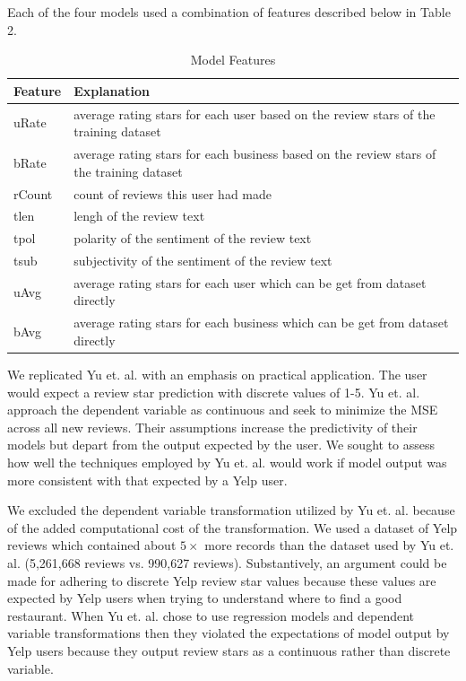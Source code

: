 \documentclass[12pt]{article}
\begin{document}
Each of the four models used a combination of features described below in Table 2.

\begin{table}[h]
  \caption{\label{tab:features}Model Features}
  \centering
\begin{tabular}{| l | l |}
  \hline
  \textbf{Feature} & \textbf{Explanation} \\
  \hline
  uRate & average rating stars for each user based on the review stars of the
          training dataset \\
  \hline
  bRate & average rating stars for each business based on the review stars of the training 
          dataset \\
  \hline
  rCount & count of reviews this user had made \\
  \hline
  tlen & lengh of the review text \\
  \hline
  tpol & polarity of the sentiment of the review text \\
  \hline
  tsub & subjectivity of the sentiment of the review text \\
  \hline
  uAvg & average rating stars for each user which can be get from dataset directly \\
  \hline
  bAvg & average rating stars for each business which can be get from dataset directly \\
  \hline
\end{tabular}
\end{table}

We replicated Yu et. al. \cite{yu2015restaurants} with an emphasis on practical application. The
user would expect a review star prediction with discrete values of 1-5. Yu et. al.
\cite{yu2015restaurants} approach the dependent variable as continuous and seek to minimize
the MSE across all new reviews. Their assumptions increase the predictivity of their models but
depart from the output expected by the user. We sought to assess how well the techniques employed
by Yu et. al. would work if model output was more consistent with that expected by a Yelp user.

We excluded the dependent variable transformation utilized by Yu et. al. \cite{yu2015restaurants}
because of the added computational cost of the transformation. We used a dataset of Yelp reviews
which contained about $5 \times$ more records than the dataset used by Yu et. al. \cite{yu2015restaurants} (5,261,668 reviews vs. 990,627 reviews). Substantively, an argument could be made for
adhering to discrete Yelp review star values because these values are expected by Yelp users
when trying to understand where to find a good restaurant. When Yu et. al. \cite{yu2015restaurants}
chose to use regression models and dependent variable transformations then they violated
the expectations of model output by Yelp users because they output review stars as a continuous
rather than discrete variable.
\end{document}
